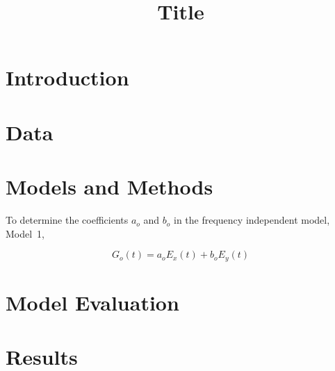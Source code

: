 \documentclass[draft,linenumbers]{agujournal2018}
\begin{document}
\title{Title}





\begin{keypoints}
\item 
\item 
\item 
\end{keypoints}

\begin{abstract}
\end{abstract}

\section{Introduction}

\section{Data}
\label{section:Data}

\section{Models and Methods}
\label{section:Models_and_Methods}

To determine the coefficients $a_o$ and $b_o$ in the frequency independent model, Model~1,

\begin{linenomath*}
  \begin{equation}
    G_o(t) = a_oE_x(t) + b_oE_y(t)
    \label{model1}
  \end{equation}
\end{linenomath*}

\noindent

\section{Model Evaluation}
\label{section:Model_Evaluation}

\section{Results}
\label{Results}
\end{document}

